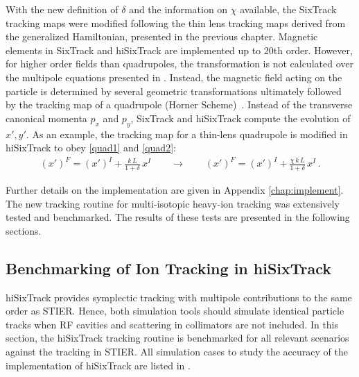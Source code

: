 With the new definition of $\delta$ and the information on $\chi$ available, the SixTrack tracking maps were modified following the thin lens tracking maps derived from the generalized Hamiltonian, presented in the previous chapter. Magnetic elements in SixTrack and hiSixTrack are implemented up to 20th order. However, for higher order fields than quadrupoles, the transformation is not calculated over the multipole equations presented in . Instead, the magnetic field acting on the particle is determined by several geometric transformations ultimately followed by the tracking map of a quadrupole (Horner Scheme)~\cite{SixTrackref01}.
\newpage
Instead of the transverse canonical momenta $p_x$ and $p_y$, SixTrack and hiSixTrack compute the evolution of $x',y'$. As an example, the tracking map for a thin-lens quadrupole is modified in hiSixTrack to obey \eqref{quad1} and \eqref{quad2}:
%
\begin{align}
  (x')^F = (x')^I + \frac{k \, L}{1+\delta} \, x^I \quad \quad \rightarrow \quad \quad   (x')^F = (x')^I + \frac{\chi \, k \, L}{1+\delta} \, x^I \, .
\end{align}

Further details on the implementation are given in Appendix \ref{chap:implement}. The new tracking routine for multi-isotopic heavy-ion tracking was extensively tested and benchmarked. The results of these tests are presented in the following sections.





\subsection{Benchmarking of Ion Tracking in hiSixTrack}

hiSixTrack provides symplectic tracking with multipole contributions to the same order as STIER. Hence, both simulation tools should simulate identical particle tracks when RF cavities and scattering in collimators are not included. In this section, the hiSixTrack tracking routine is benchmarked for all relevant scenarios against the tracking in STIER.  All simulation cases to study the accuracy of the implementation of hiSixTrack are listed in .

